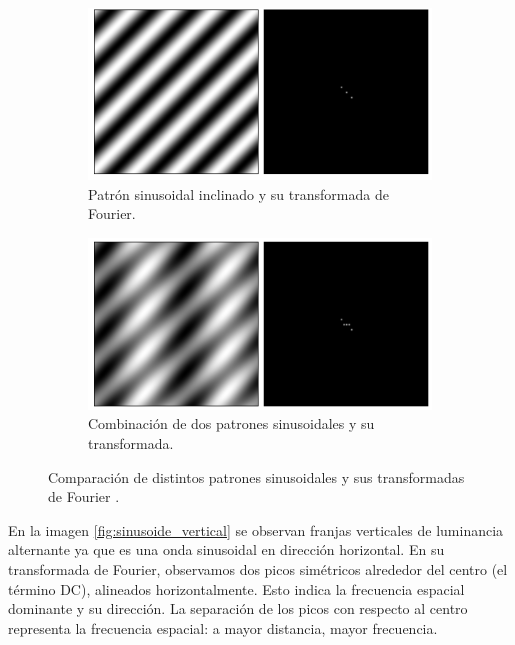 \begin{figure}[!htbp]
    \begin{subfigure}[b]{0.45\textwidth}
        \centering
        \includegraphics[width=\textwidth]{img/f3.png}
        \caption{Patrón sinusoidal inclinado y su transformada de Fourier.}
        \label{fig:sinusoide_inclinada}
    \end{subfigure}
    \hfill
    \begin{subfigure}[b]{0.45\textwidth}
        \centering
        \includegraphics[width=\textwidth]{img/f4.png}
        \caption{Combinación de dos patrones sinusoidales y su transformada.}
        \label{fig:suma_sinusoidales}
    \end{subfigure}

    \caption{Comparación de distintos patrones sinusoidales y sus transformadas de Fourier \parencite{leharFourier}.}
    \label{fig:cuadricula_sinusoidales}
\end{figure}


En la imagen \ref{fig:sinusoide_vertical} se observan franjas verticales de luminancia alternante ya que es una onda sinusoidal en dirección horizontal. En su transformada de Fourier, observamos dos picos simétricos alrededor del centro (el término DC), alineados horizontalmente. Esto indica la frecuencia espacial dominante y su dirección. La separación de los picos con respecto al centro representa la frecuencia espacial: a mayor distancia, mayor frecuencia. 



